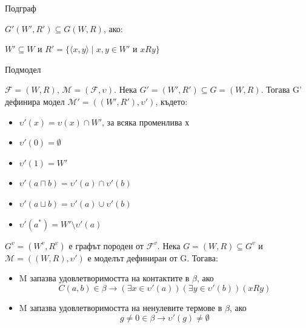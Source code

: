 \documentclass[14pt, aspectratio=169]{beamer}
\newcommand\M{\mathcal{M}}
\newcommand\F{\mathcal{F}}
\newcommand{\pair}[2]{ \langle #1, #2 \rangle }
\newcommand{\pairXY}{ \pair{x}{y} }
\begin{document}
\begin{frame}{Подграф}
	\begin{definition}[Подграф]
		$G'(W', R') \subseteq G(W, R)$, ако:
		\begin{center}
			$W' \subseteq W$ и $R' = \{ \pairXY  \mid x, y \in W'$ и $xRy \}$
		\end{center}
	\end{definition}
\end{frame}

\begin{frame}{Подмодел}
	\begin{lemma}[Подмодел]
		$\F = (W, R)$, $\M = (\F, \upsilon)$. Нека $G'=(W',R') \subseteq G=(W, R)$. Тогава G' дефинира модел $\M' = ((W', R'), \upsilon')$, където:
		\begin{itemize}
			\item $\upsilon'(x) = \upsilon(x) \cap W'$, за всяка променлива х
			\item $\upsilon'(0) = \emptyset$
			\item $\upsilon'(1) = W'$
			\item $\upsilon'(a \sqcap b) = \upsilon'(a) \cap \upsilon'(b)$
			\item $\upsilon'(a \sqcup b) = \upsilon'(a) \cup \upsilon'(b)$
			\item $\upsilon'(a^*) = W' \setminus \upsilon'(a)$
		\end{itemize}
	\end{lemma}
\end{frame}

\begin{frame}
	\begin{lemma}
		$G^v=(W^v, R^v)$ е графът породен от $\F^v$. Нека $G=(W,R) \subseteq G^v$ и $\M=((W,R), \upsilon')$ е моделът дефиниран от G. Тогава:
		\begin{itemize}
			\item<1-> M запазва удовлетворимостта на контактите в $\beta$, ако
			\begin{equation*}
				C(a,b) \in \beta \rightarrow (\exists x \in \upsilon'(a))(\exists y \in \upsilon'(b))(xRy)
			\end{equation*}

			\item<2-> M запазва удовлетворимостта на ненулевите термове в $\beta$, ако
			\begin{equation*}
				g \neq 0 \in \beta \rightarrow \upsilon'(g) \neq \emptyset
			\end{equation*}
		\end{itemize}
	\end{lemma}
\end{frame}
\end{document}
